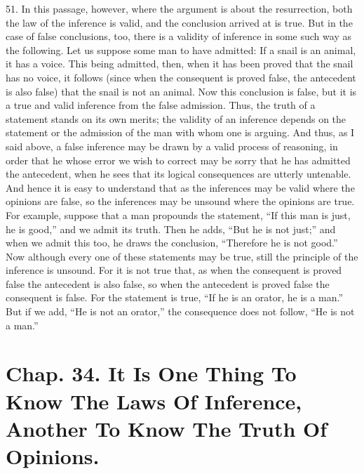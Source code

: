 51. In this passage, however, where the argument is about the
resurrection, both the law of the inference is valid, and the
conclusion arrived at is true. But in the case of false conclusions,
too, there is a validity of inference in some such way as the
following. Let us suppose some man to have admitted: If a snail is an
animal, it has a voice. This being admitted, then, when it has been
proved that the snail has no voice, it follows (since when the
consequent is proved false, the antecedent is also false) that the
snail is not an animal. Now this conclusion is false, but it is a true
and valid inference from the false admission. Thus, the truth of a
statement stands on its own merits; the validity of an inference
depends on the statement or the admission of the man with whom one is
arguing. And thus, as I said above, a false inference may be drawn by
a valid process of reasoning, in order that he whose error we wish to
correct may be sorry that he has admitted the antecedent, when he sees
that its logical consequences are utterly untenable. And hence it is
easy to understand that as the inferences may be valid where the
opinions are false, so the inferences may be unsound where the
opinions are true. For example, suppose that a man propounds the
statement, ``If this man is just, he is good,'' and we admit its
truth. Then he adds, ``But he is not just;'' and when we admit this
too, he draws the conclusion, ``Therefore he is not good.'' Now
although every one of these  statements may be true, still
the principle of the inference is unsound. For it is not true that, as
when the consequent is proved false the antecedent is also false, so
when the antecedent is proved false the consequent is false. For the
statement is true, ``If he is an orator, he is a man.'' But if we add,
``He is not an orator,'' the consequence does not follow, ``He is not
a man.''

\section{Chap. 34. It Is One Thing To Know The Laws Of Inference,
Another To Know The Truth Of Opinions.}

